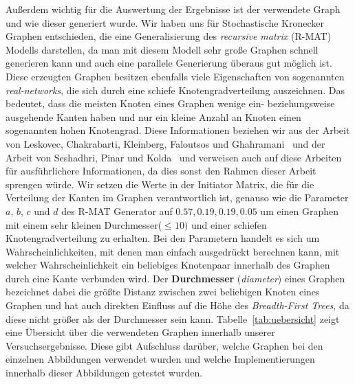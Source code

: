 \documentclass[11pt,a4paper]{article}
\begin{document}
Außerdem wichtig für die Auswertung der Ergebnisse ist der verwendete Graph und wie dieser generiert wurde. Wir haben uns für Stochastische Kronecker Graphen entschieden, die eine Generalisierung des \textit{recursive matrix} (R-MAT) Modells darstellen, da man mit diesem Modell sehr große Graphen schnell generieren kann und auch eine parallele Generierung überaus gut möglich ist. Diese erzeugten Graphen besitzen ebenfalls viele Eigenschaften von sogenannten \textit{real-networks}, die sich durch eine schiefe Knotengradverteilung auszeichnen. Das bedeutet, dass die meisten Knoten eines Graphen wenige ein- beziehungsweise ausgehende Kanten haben und nur ein kleine Anzahl an Knoten einen sogenannten hohen Knotengrad. Diese Informationen beziehen wir aus der Arbeit von Leskovec, Chakrabarti, Kleinberg, Faloutsos und Ghahramani~\cite{kronecker} und der Arbeit von Seshadhri, Pinar und Kolda~\cite{kronecker_study} und verweisen auch auf diese Arbeiten für ausführlichere Informationen, da dies sonst den Rahmen dieser Arbeit sprengen würde. Wir setzen die Werte in der Initiator Matrix, die für die Verteilung der Kanten im Graphen verantwortlich ist, genauso wie die Parameter \(a\), \(b\), \(c\) und \(d\) des R-MAT Generator auf \(0.57, 0.19, 0.19, 0.05\) um einen Graphen mit einem sehr kleinen Durchmesser(\(\leq 10)\) und einer schiefen Knotengradverteilung zu erhalten.  Bei den Parametern handelt es sich um Wahrscheinlichkeiten, mit denen man einfach ausgedrückt berechnen kann, mit welcher Wahrscheinlichkeit ein beliebiges Knotenpaar innerhalb des Graphen durch eine Kante verbunden wird. Der \textbf{Durchmesser} (\textit{diameter}) eines Graphen bezeichnet dabei die größte Distanz zwischen zwei beliebigen Knoten eines Graphen und hat auch direkten Einfluss auf die Höhe des \textit{Breadth-First Trees}, da diese nicht größer als der Durchmesser sein kann. Tabelle~\ref{tab:uebersicht} zeigt eine Übersicht über die verwendeten Graphen innerhalb unserer Versuchsergebnisse. Diese gibt Aufschluss darüber, welche Graphen bei den einzelnen Abbildungen verwendet wurden und welche Implementierungen innerhalb dieser Abbildungen getestet wurden.\\
\end{document}
